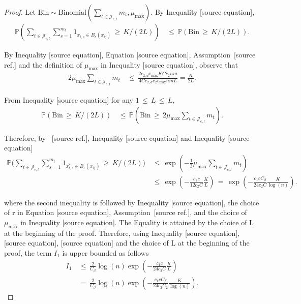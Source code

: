 \documentclass[twoside,11pt]{article}
\makeatletter
\newcommand{\discardlabel}[1]{}
\newcommand{\discardtwo}[2]{}
\newcommand{\legacyref}[1]{\textup{[source ref.]}}
\newcommand{\legacyeqref}[1]{\textup{[source equation]}}
\newenvironment{legacycomparison}{%
  \begingroup\color{legacygray}%
  \let\label\discardlabel
  \let\originallabel\discardlabel
  \let\ref\legacyref
  \let\pageref\legacyref
  \let\eqref\legacyeqref
  \let\cref\legacyref
  \let\Cref\legacyref
  \let\autoref\legacyref
  \let\aliasref\discardtwo
}{\endgroup}
\newcommand{\aliasref}[2]{%
  \@ifundefined{r@#2}{}{%
    \expandafter\let\csname r@#1\expandafter\endcsname\csname r@#2\endcsname}}
\makeatother
\begin{document}
\begin{legacycomparison}
\begin{proof}
Let \( \text{Bin} \sim \text{Binomial}\left(\sum_{t \in \mathcal{J}_{e,l}} m_t, \mu_{\max} \right) \). By Inequality \eqref{eq:272},
\begin{align}
    \mathbb{P}\left( \sum_{t \in \mathcal{J}_{e,l}} \sum_{s=1}^{m_t} 1_{x_{t,s} \in B_{r}(x_{ij})} \,\geq\, K/(2L) \right) 
    &\,\leq\, \mathbb{P}(\text{Bin} \,\geq\, K/(2L)). \label{eq:280}
\end{align}

By Inequality \eqref{eq:273}, Equation \eqref{eq:276}, Assumption~\ref{asm:m} and the definition of \( \mu_{\max} \) in Inequality \eqref{eq:272}, observe that
\begin{align}
    2\mu_{\max} \sum_{t \in \mathcal{J}_{e,l}} m_t 
    &\,\leq\, \frac{2c_{2,d}v_{\max} K Cc_2nm}{4Cc_{2,d}c_2v_{\max} nm L} 
    = \frac{K}{2L}. \label{eq:281}
\end{align}

From Inequality \eqref{eq:281} for any \( 1 \,\leq\, L \,\leq\, L \),
\begin{align}
    \mathbb{P}(\text{Bin} \,\geq\, K/(2L)) 
    &\,\leq\, \mathbb{P}(\text{Bin} \,\geq\, 2\mu_{\max} \sum_{t \in \mathcal{J}_{e,l}} m_t). \label{eq:282}
\end{align}

Therefore, by ~\ref{Lemma_12}, Inequality \eqref{eq:280} and Inequality \eqref{eq:282}
\begin{align}
    \mathbb{P}\Bigg( \sum_{t \in \mathcal{J}_{e,l}} \sum_{s=1}^{m_t}  1_{x_{t,s}^* \in B_{r}(x_{ij})} \,\geq\, K/(2L) \Bigg) &\,\leq\, \exp\left(-\frac{1}{3}\mu_{\max} \sum_{t \in \mathcal{J}_{e,l}} m_t \right) \nonumber \\
    &\,\leq\, \exp\left(-\frac{c_1c}{12c_2C} \frac{K}{L} \right) \,=\, \exp\left(-\frac{c_1cC_{\beta}}{24c_2C} \frac{K}{\log(n)} \right). \label{eq:283}
\end{align}

where the second inequality is followed by Inequality \eqref{eq:273}, the choice of r in Equation \eqref{eq:276}, Assumption~\ref{asm:m}, and the choice of $\mu_{\max}$ in Inequality \eqref{eq:272}. The Equality is attained by the choice of L at the beginning of the proof. Therefore, using Inequality \eqref{eq:280}, \eqref{eq:282}, \eqref{eq:283} and the choice of L at the beginning of the proof, the term \( I_1 \) is upper bounded as follows
\begin{align}
    I_1 &\,\leq\, \frac{2}{C_{\beta}} \log(n) \exp\left(-\frac{c_1c}{24c_2C} \frac{K}{L} \right) \nonumber \\
    &\,=\, \frac{2}{C_{\beta}} \log(n) \exp\left(-\frac{c_1cC_{\beta}}{24c_2C_2} \frac{K}{ \log(n)} \right). \label{eq:284}
\end{align}


\end{proof}
\end{legacycomparison}
\end{document}
